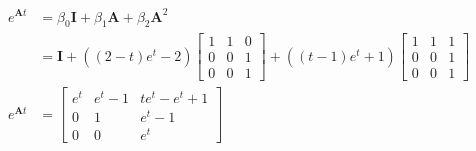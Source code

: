 \begin{align*}
    e^{\mathbf{A}t} &= \beta_0 \mathbf{I} +  \beta_1 \mathbf{A} + \beta_2 \mathbf{A}^2\\
    &= \mathbf{I} +  ((2-t) e^t -2) \begin{bmatrix}
           1& 1& 0\\
           0 & 0 & 1\\
           0 & 0 &1
          \end{bmatrix}
+
((t-1) e^t +1)       \begin{bmatrix}
            1 & 1&1\\
            0 &0&1\\
            0 &0 &1
        \end{bmatrix}\\
         e^{\mathbf{A}t} &=  \begin{bmatrix}
            e^t & e^t -1 & t e^t - e^t +1 \\
            0 & 1 & e^t -1\\
            0 & 0 & e^t
        \end{bmatrix}\\
 \end{align*}

